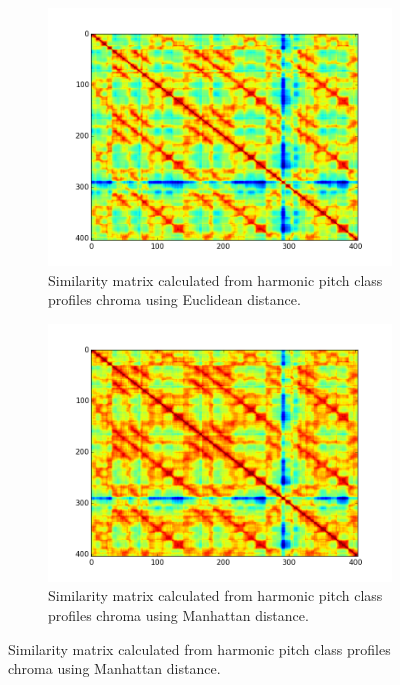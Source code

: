 \begin{figure}[b]
        \centering
        \begin{subfigure}[b]{0.31\textwidth}
                \includegraphics[width=\textwidth]{Figures/ssm_euclidean}
                \caption{Similarity matrix calculated from harmonic pitch class profiles chroma using Euclidean distance.}
                \label{fig:euclidean}
        \end{subfigure}%
        \begin{subfigure}[b]{0.31\textwidth}
                \includegraphics[width=\textwidth]{Figures/ssm_manhattan}
                \caption{Similarity matrix calculated from harmonic pitch class profiles chroma using Manhattan distance.}

\end{subfigure}
\end{figure}
